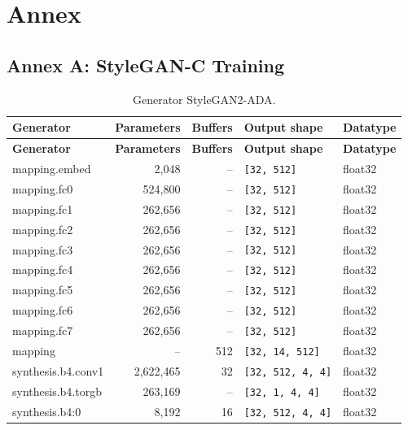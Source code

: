 \appendix
\chapter{Annex}
\section{Annex A: StyleGAN-C Training}

\begin{footnotesize}
\begin{longtable}{@{}lrrll@{}}
\caption{Generator StyleGAN2-ADA.}\\
\toprule
\textbf{Generator} & \textbf{Parameters} & \textbf{Buffers} & \textbf{Output shape} & \textbf{Datatype} \\
\midrule
\endfirsthead
\toprule
\textbf{Generator} & \textbf{Parameters} & \textbf{Buffers} & \textbf{Output shape} & \textbf{Datatype} \\
\midrule
\endhead
mapping.embed        & 2{,}048   & --     & \texttt{[32, 512]}            & float32 \\
mapping.fc0          & 524{,}800 & --     & \texttt{[32, 512]}            & float32 \\
mapping.fc1          & 262{,}656 & --     & \texttt{[32, 512]}            & float32 \\
mapping.fc2          & 262{,}656 & --     & \texttt{[32, 512]}            & float32 \\
mapping.fc3          & 262{,}656 & --     & \texttt{[32, 512]}            & float32 \\
mapping.fc4          & 262{,}656 & --     & \texttt{[32, 512]}            & float32 \\
mapping.fc5          & 262{,}656 & --     & \texttt{[32, 512]}            & float32 \\
mapping.fc6          & 262{,}656 & --     & \texttt{[32, 512]}            & float32 \\
mapping.fc7          & 262{,}656 & --     & \texttt{[32, 512]}            & float32 \\
mapping              & --        & 512    & \texttt{[32, 14, 512]}        & float32 \\
synthesis.b4.conv1   & 2{,}622{,}465 & 32 & \texttt{[32, 512, 4, 4]}      & float32 \\
synthesis.b4.torgb   & 263{,}169 & --     & \texttt{[32, 1, 4, 4]}        & float32 \\
synthesis.b4:0       & 8{,}192   & 16     & \texttt{[32, 512, 4, 4]}      & float32 \\

\end{longtable}
\end{footnotesize}
